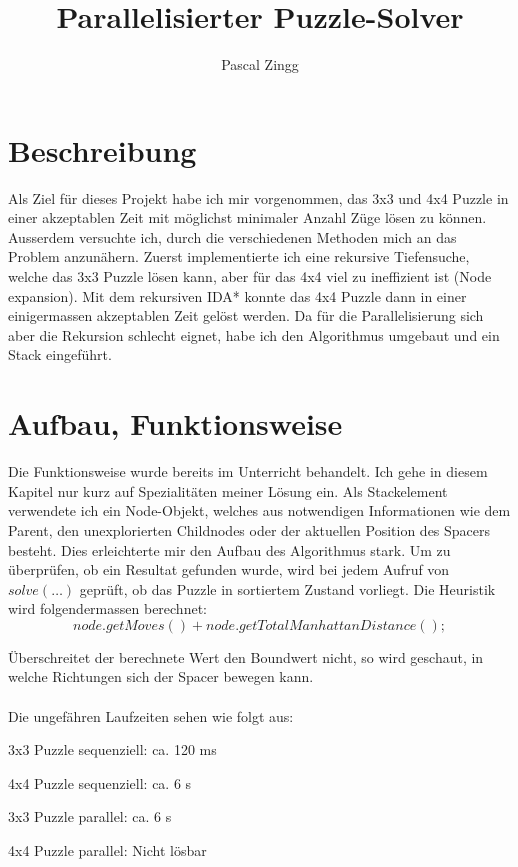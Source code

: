 \documentclass[10pt]{article}         %
\title{Parallelisierter Puzzle-Solver}
\author{Pascal Zingg}
\begin{document}
\maketitle

\section{Beschreibung}
Als Ziel für dieses Projekt habe ich mir vorgenommen, das 3x3 und 4x4 Puzzle in einer akzeptablen Zeit mit möglichst minimaler Anzahl Züge lösen zu können. Ausserdem versuchte ich, durch die verschiedenen Methoden mich an das Problem anzunähern. Zuerst implementierte ich eine rekursive Tiefensuche, welche das 3x3 Puzzle lösen kann, aber für das 4x4 viel zu ineffizient ist (Node expansion). Mit dem rekursiven IDA* konnte das 4x4 Puzzle dann in einer einigermassen akzeptablen Zeit gelöst werden. Da für die Parallelisierung sich aber die Rekursion schlecht eignet, habe ich den Algorithmus umgebaut und ein Stack eingeführt. 

\section{Aufbau, Funktionsweise}
Die Funktionsweise wurde bereits im Unterricht behandelt. Ich gehe in diesem Kapitel nur kurz auf Spezialitäten meiner Lösung ein. Als Stackelement verwendete ich ein Node-Objekt, welches aus notwendigen Informationen wie dem Parent, den unexplorierten Childnodes oder der aktuellen Position des Spacers besteht. Dies erleichterte mir den Aufbau des Algorithmus stark. Um zu überprüfen, ob ein Resultat gefunden wurde, wird bei jedem Aufruf von $solve(\dots)$ geprüft, ob das Puzzle in sortiertem Zustand vorliegt. Die Heuristik wird folgendermassen berechnet:
\[
node.getMoves() + node.getTotalManhattanDistance();
\]

Überschreitet der berechnete Wert den Boundwert nicht, so wird geschaut, in welche Richtungen sich der Spacer bewegen kann. \\ \\
Die ungefähren Laufzeiten sehen wie folgt aus:
\begin{list}{}{}
\item 3x3 Puzzle sequenziell: ca. 120 ms
\item 4x4 Puzzle sequenziell: ca. 6 s

\item 3x3 Puzzle parallel: ca. 6 s
\item 4x4 Puzzle parallel: Nicht lösbar
\end{list}
\end{document}
